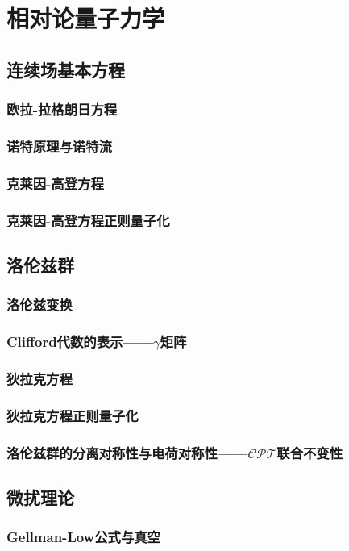 \documentclass[a4paper,11pt]{book}
\begin{document}
\part{相对论量子力学}
\chapter{连续场基本方程}
\section{欧拉-拉格朗日方程}
\section{诺特原理与诺特流}
\section{克莱因-高登方程}
\section{克莱因-高登方程正则量子化}
\chapter{洛伦兹群}
\section{洛伦兹变换}
\section{Clifford代数的表示——$\gamma$矩阵}
\section{狄拉克方程}
\section{狄拉克方程正则量子化}
\section{洛伦兹群的分离对称性与电荷对称性——$\mathcal{CPT}$联合不变性}
\chapter{微扰理论}
\section{Gellman-Low公式与真空}
\end{document}
